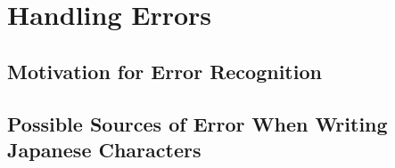 







\section{Handling Errors}
\label{sec:concept:handlingerrors}



\subsection{Motivation for Error Recognition}
\label{sec:concept:motivationforerrorrecognition}


\subsection[Sources of Error]{Possible Sources of Error When Writing Japanese Characters}
\label{sec:concept:sourcesoferror}

